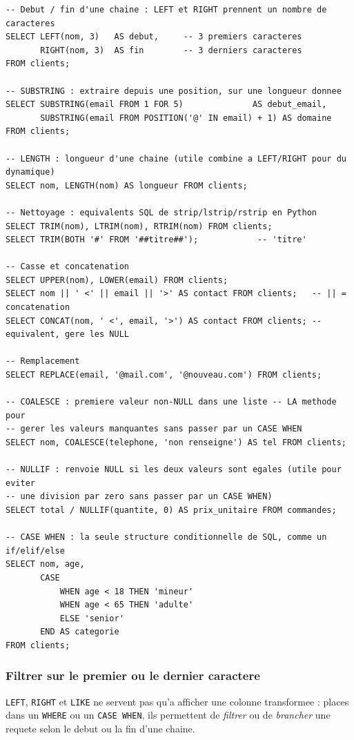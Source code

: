 \documentclass[11pt,a4paper]{article}
\begin{document}
\begin{lstlisting}
-- Debut / fin d'une chaine : LEFT et RIGHT prennent un nombre de caracteres
SELECT LEFT(nom, 3)   AS debut,     -- 3 premiers caracteres
       RIGHT(nom, 3)  AS fin        -- 3 derniers caracteres
FROM clients;

-- SUBSTRING : extraire depuis une position, sur une longueur donnee
SELECT SUBSTRING(email FROM 1 FOR 5)              AS debut_email,
       SUBSTRING(email FROM POSITION('@' IN email) + 1) AS domaine
FROM clients;

-- LENGTH : longueur d'une chaine (utile combine a LEFT/RIGHT pour du dynamique)
SELECT nom, LENGTH(nom) AS longueur FROM clients;

-- Nettoyage : equivalents SQL de strip/lstrip/rstrip en Python
SELECT TRIM(nom), LTRIM(nom), RTRIM(nom) FROM clients;
SELECT TRIM(BOTH '#' FROM '##titre##');            -- 'titre'

-- Casse et concatenation
SELECT UPPER(nom), LOWER(email) FROM clients;
SELECT nom || ' <' || email || '>' AS contact FROM clients;   -- || = concatenation
SELECT CONCAT(nom, ' <', email, '>') AS contact FROM clients; -- equivalent, gere les NULL

-- Remplacement
SELECT REPLACE(email, '@mail.com', '@nouveau.com') FROM clients;

-- COALESCE : premiere valeur non-NULL dans une liste -- LA methode pour
-- gerer les valeurs manquantes sans passer par un CASE WHEN
SELECT nom, COALESCE(telephone, 'non renseigne') AS tel FROM clients;

-- NULLIF : renvoie NULL si les deux valeurs sont egales (utile pour eviter
-- une division par zero sans passer par un CASE WHEN)
SELECT total / NULLIF(quantite, 0) AS prix_unitaire FROM commandes;

-- CASE WHEN : la seule structure conditionnelle de SQL, comme un if/elif/else
SELECT nom, age,
       CASE
           WHEN age < 18 THEN 'mineur'
           WHEN age < 65 THEN 'adulte'
           ELSE 'senior'
       END AS categorie
FROM clients;
\end{lstlisting}

\subsubsection*{Filtrer sur le premier ou le dernier caractere}
\texttt{LEFT}, \texttt{RIGHT} et \texttt{LIKE} ne servent pas qu'a afficher une
colonne transformee : places dans un \texttt{WHERE} ou un \texttt{CASE WHEN},
ils permettent de \emph{filtrer} ou de \emph{brancher} une requete selon le
debut ou la fin d'une chaine.
\end{document}
